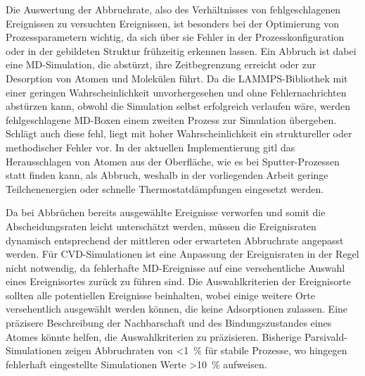 Die Auswertung der Abbruchrate, also des Verhältnisses von fehlgeschlagenen Ereignissen zu versuchten Ereignissen, ist besonders bei der Optimierung von Prozessparametern wichtig, da sich über sie Fehler in der Prozesskonfiguration oder in der gebildeten Struktur frühzeitig erkennen lassen.
Ein Abbruch ist dabei eine MD-Simulation, die abstürzt, ihre Zeitbegrenzung erreicht oder zur Desorption von Atomen und Molekülen führt.
Da die LAMMPS-Bibliothek mit einer geringen Wahrscheinlichkeit unvorhergesehen und ohne Fehlernachrichten abstürzen kann, obwohl die Simulation selbst erfolgreich verlaufen wäre, werden fehlgeschlagene MD-Boxen einem zweiten Prozess zur Simulation übergeben.
Schlägt auch diese fehl, liegt mit hoher Wahrscheinlichkeit ein struktureller oder methodischer Fehler vor.
In der aktuellen Implementierung gitl das Herausschlagen von Atomen aus der Oberfläche, wie es bei Sputter-Prozessen statt finden kann, als Abbruch, weshalb in der vorliegenden Arbeit geringe Teilchenenergien oder schnelle Thermostatdämpfungen eingesetzt werden.

Da bei Abbrüchen bereits ausgewählte Ereignisse verworfen und somit die Abscheidungsraten leicht unterschätzt werden, müssen die Ereignisraten dynamisch entsprechend der mittleren oder erwarteten Abbruchrate angepasst werden.
Für CVD-Simulationen ist eine Anpassung der Ereignisraten in der Regel nicht notwendig, da fehlerhafte MD-Ereignisse auf eine versehentliche Auswahl eines Ereignisortes zurück zu führen sind.
Die Auswahlkriterien der Ereignisorte sollten alle potentiellen Ereignisse beinhalten, wobei einige weitere Orte versehentlich ausgewählt werden können, die keine Adsorptionen zulassen.
Eine präzisere Beschreibung der Nachbarschaft und des Bindungszustandes eines Atomes könnte helfen, die Auswahlkriterien zu präzisieren.
Bisherige Parsivald-Simulationen zeigen Abbruchraten von \SI{<1}{\percent} für stabile Prozesse, wo hingegen fehlerhaft eingestellte Simulationen Werte \SI{>10}{\percent} aufweisen.
